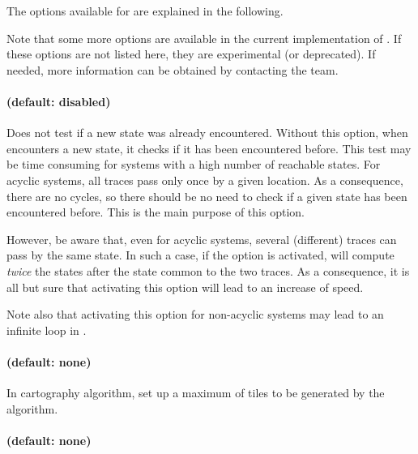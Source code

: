 The options available for \imitator{} are explained in the following.

Note that some more options are available in the current implementation of \imitator{}.
If these options are not listed here, they are experimental (or deprecated).
If needed, more information can be obtained by contacting the \imitator{} team.



\paragraph{ (default: disabled)}
Does not test if a new state was already encountered.
Without this option, when \imitator{} encounters a new state, it checks if it has been encountered before.
This test may be time consuming for systems with a high number of reachable states.
For acyclic systems, all traces pass only once by a given location.
As a consequence, there are no cycles, so there should be no need to check if a given state has been encountered before.
This is the main purpose of this option.

However, be aware that, even for acyclic systems, several (different) traces can pass by the same state.
In such a case, if the  option is activated, \imitator{} will compute \emph{twice} the states after the state common to the two traces.
As a consequence, it is all but sure that activating this option will lead to an increase of speed.

Note also that activating this option for non-acyclic systems may lead to an infinite loop in \imitator{}.


\paragraph{ (default: none)}

In cartography algorithm, set up a maximum of tiles to be generated by the algorithm.


\paragraph{ (default: none)}


